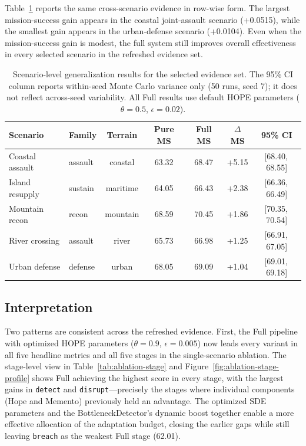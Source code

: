 Table~\ref{tab:generalization-scenes} reports the same cross-scenario evidence in row-wise form. The largest mission-success gain appears in the coastal joint-assault scenario (+0.0515), while the smallest gain appears in the urban-defense scenario (+0.0104). Even when the mission-success gain is modest, the full system still improves overall effectiveness in every selected scenario in the refreshed evidence set.

\begin{table}[H]
\centering
\caption{Scenario-level generalization results for the selected evidence set. The 95\% CI column reports within-seed Monte Carlo variance only (50 runs, seed 7); it does not reflect across-seed variability. All Full results use default HOPE parameters ($\theta=0.5$, $\epsilon=0.02$).}
\label{tab:generalization-scenes}
\footnotesize
\setlength{\tabcolsep}{2.5pt}
\begin{tabular}{llccccc}
\toprule
Scenario & Family & Terrain & Pure MS & Full MS & $\Delta$MS & 95\% CI \\
\midrule
Coastal assault & assault & coastal & 63.32 & 68.47 & +5.15 & [68.40,\,68.55] \\
Island resupply & sustain & maritime & 64.05 & 66.43 & +2.38 & [66.36,\,66.49] \\
Mountain recon & recon & mountain & 68.59 & 70.45 & +1.86 & [70.35,\,70.54] \\
River crossing & assault & river & 65.73 & 66.98 & +1.25 & [66.91,\,67.05] \\
Urban defense & defense & urban & 68.05 & 69.09 & +1.04 & [69.01,\,69.18] \\
\bottomrule
\end{tabular}
\end{table}

\FloatBarrier

\subsection{Interpretation}

Two patterns are consistent across the refreshed evidence. First, the Full pipeline with optimized HOPE parameters ($\theta=0.9$, $\epsilon=0.005$) now leads every variant in all five headline metrics and all five stages in the single-scenario ablation. The stage-level view in Table~\ref{tab:ablation-stage} and Figure~\ref{fig:ablation-stage-profile} shows Full achieving the highest score in every stage, with the largest gains in \texttt{detect} and \texttt{disrupt}---precisely the stages where individual components (Hope and Memento) previously held an advantage. The optimized SDE parameters and the BottleneckDetector's dynamic boost together enable a more effective allocation of the adaptation budget, closing the earlier gaps while still leaving \texttt{breach} as the weakest Full stage (62.01).

